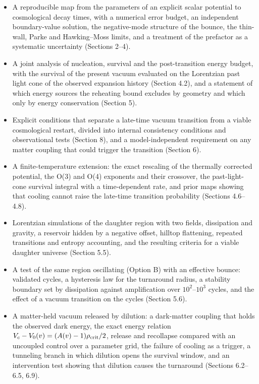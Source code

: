 \documentclass[11pt,a4paper]{article}
\begin{document}
\begin{itemize}\item A reproducible map from the parameters of an explicit scalar potential to cosmological decay times, with a numerical error budget, an independent boundary-value solution, the negative-mode structure of the bounce, the thin-wall, Parke and Hawking--Moss limits, and a treatment of the prefactor as a systematic uncertainty (Sections 2--4).
\item A joint analysis of nucleation, survival and the post-transition energy budget, with the survival of the present vacuum evaluated on the Lorentzian past light cone of the observed expansion history (Section 4.2), and a statement of which energy sources the reheating bound excludes by geometry and which only by energy conservation (Section 5).
\item Explicit conditions that separate a late-time vacuum transition from a viable cosmological restart, divided into internal consistency conditions and observational tests (Section 8), and a model-independent requirement on any matter coupling that could trigger the transition (Section 6).
\item A finite-temperature extension: the exact rescaling of the thermally corrected potential, the O(3) and O(4) exponents and their crossover, the past-light-cone survival integral with a time-dependent rate, and prior maps showing that cooling cannot raise the late-time transition probability (Sections 4.6--4.8).
\item Lorentzian simulations of the daughter region with two fields, dissipation and gravity, a reservoir hidden by a negative offset, hilltop flattening, repeated transitions and entropy accounting, and the resulting criteria for a viable daughter universe (Section 5.5).
\item A test of the same region oscillating (Option B) with an effective bounce: validated cycles, a hysteresis law for the turnaround radius, a stability boundary set by dissipation against amplification over $10^2$--$10^3$ cycles, and the effect of a vacuum transition on the cycles (Section 5.6).
\item A matter-held vacuum released by dilution: a dark-matter coupling that holds the observed dark energy, the exact energy relation $V_c-V_0(v)=(A(v)-1)\rho_{\rm crit}/2$, release and recollapse compared with an uncoupled control over a parameter grid, the failure of cooling as a trigger, a tunneling branch in which dilution opens the survival window, and an intervention test showing that dilution causes the turnaround (Sections 6.2--6.5, 6.9).

\end{itemize}
\end{document}
